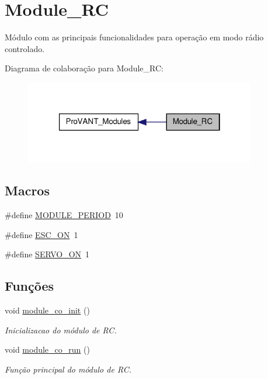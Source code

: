\hypertarget{group__Module__RC}{\section{Module\-\_\-\-R\-C}
\label{group__Module__RC}
}


Módulo com as principais funcionalidades para operação em modo rádio controlado.  


Diagrama de colaboração para Module\-\_\-\-R\-C\-:
\nopagebreak
\begin{figure}[H]
\begin{center}
\leavevmode
\includegraphics[width=286pt]{group__Module__RC}
\end{center}
\end{figure}
\subsection*{Macros}
\begin{DoxyCompactItemize}
\item 
\#define \hyperlink{group__Module__RC_ga0ac6c9f2991b096e49c354e5cce6fae0}{M\-O\-D\-U\-L\-E\-\_\-\-P\-E\-R\-I\-O\-D}~10
\item 
\#define \hyperlink{group__Module__RC_gaec8246e954743c1eca3ed9d0b934bf8e}{E\-S\-C\-\_\-\-O\-N}~1
\item 
\#define \hyperlink{group__Module__RC_ga162e9e4abd94f1558733bbf17fca28e9}{S\-E\-R\-V\-O\-\_\-\-O\-N}~1
\end{DoxyCompactItemize}
\subsection*{Funções}
\begin{DoxyCompactItemize}
\item 
void \hyperlink{group__Module__RC_gabedb9a5c3739466a359c93b3585a3640}{module\-\_\-co\-\_\-init} ()
\begin{DoxyCompactList}\small\item\em Inicializacao do módulo de R\-C. \end{DoxyCompactList}\item 
void \hyperlink{group__Module__RC_gaab8216fc955d01b47e3431aae288d9d3}{module\-\_\-co\-\_\-run} ()
\begin{DoxyCompactList}\small\item\em Função principal do módulo de R\-C. \end{DoxyCompactList}\end{DoxyCompactItemize}
